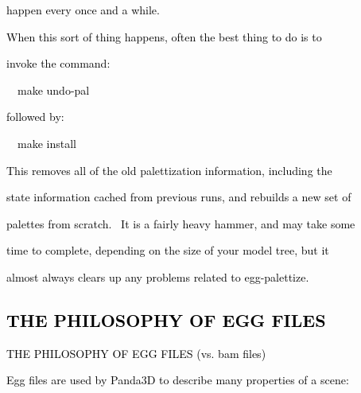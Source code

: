 \documentclass[a4paper]{article}
\newcommand\textstyleOOoComputerKeyWord[1]{\textrm{\textcolor[rgb]{0.0,0.0,0.5019608}{#1}}}
\begin{document}
{\color{black}
\textstyleOOoComputerKeyWord{\textcolor{black}{happen every once and a while.}}}

{\color{black}
\textstyleOOoComputerKeyWord{\textcolor{black}{When this sort of thing happens, often the best thing to do is to}}}

{\color{black}
\textstyleOOoComputerKeyWord{\textcolor{black}{invoke the command:}}}


\bigskip

{\color{black}
\textstyleOOoComputerKeyWord{\textcolor{black}{\ \ make undo-pal}}}


\bigskip

{\color{black}
\textstyleOOoComputerKeyWord{\textcolor{black}{followed by:}}}


\bigskip

{\color{black}
\textstyleOOoComputerKeyWord{\textcolor{black}{\ \ make install}}}


\bigskip

{\color{black}
\textstyleOOoComputerKeyWord{\textcolor{black}{This removes all of the old palettization information, including the}}}

\clearpage
\bigskip

{\color{black}
\textstyleOOoComputerKeyWord{\textcolor{black}{state information cached from previous runs, and rebuilds a new set of}}}

{\color{black}
\textstyleOOoComputerKeyWord{\textcolor{black}{palettes from scratch. \ It is a fairly heavy hammer, and may take
some}}}

{\color{black}
\textstyleOOoComputerKeyWord{\textcolor{black}{time to complete, depending on the size of your model tree, but it}}}

{\color{black}
\textstyleOOoComputerKeyWord{\textcolor{black}{almost always clears up any problems related to egg-palettize.}}}

\clearpage\subsection[THE PHILOSOPHY OF EGG FILES]{\textstyleOOoComputerKeyWord{\textcolor{black}{THE PHILOSOPHY OF EGG
FILES}}}
\hypertarget{RefHeading7670869075401}{}{\color{black}
\textstyleOOoComputerKeyWord{\textcolor{black}{THE PHILOSOPHY OF EGG FILES (vs. bam files)}}}


\bigskip

{\color{black}
\textstyleOOoComputerKeyWord{\textcolor{black}{Egg files are used by Panda3D to describe many properties of a scene:}}}
\end{document}
